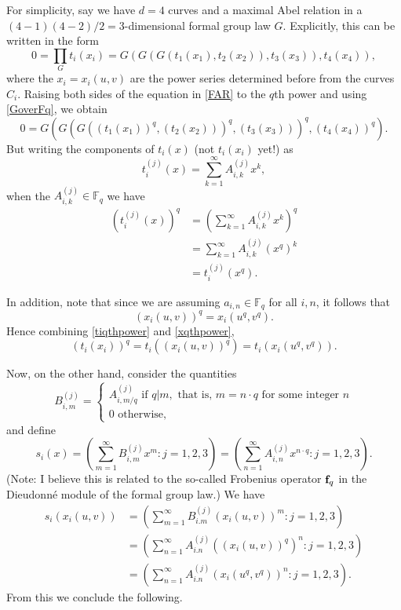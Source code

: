 \documentclass[12pt]{amsart}
\theoremstyle{theorem}
\newcommand{\FF}{\mathbb{F}}
\begin{document}
For simplicity, say we have $d = 4$ curves and a maximal Abel relation in a $(4 - 1)(4 - 2)/2 = 3$-dimensional formal group
law $G$.  Explicitly, this can be written in the form
\begin{equation}
\label{FAR}
0 = \prod_G t_i(x_i) = G(G(G(t_1(x_1),t_2(x_2)), t_3(x_3)), t_4(x_4)),
\end{equation}
where the $x_i = x_i(u,v)$ are the power series determined before from the curves $C_i$. 
Raising both sides of the equation in \eqref{FAR} to the $q$th power and using \eqref{GoverFq}, we obtain
\begin{equation}
\label{FARqthpower}
0 = G(G(G((t_1(x_1))^q,(t_2(x_2)))^q, (t_3(x_3)))^q, (t_4(x_4))^q).
\end{equation}
But writing the components of $t_i(x)$ (not $t_i(x_i)$ yet!) as 
$$t_i^{(j)}(x) = \sum_{k=1}^\infty A_{i,k}^{(j)} x^k,$$
when the $A_{i,k}^{(j)} \in \FF_q$ we have 
\begin{align}
\label{tiqthpower}
(t_i^{(j)}(x))^q &= \left(\sum_{k=1}^\infty A_{i,k}^{(j)} x^k\right)^q \nonumber \\
&=\sum_{k=1}^\infty A_{i,k}^{(j)} (x^q)^k \\
&= t_i^{(j)}(x^q).\nonumber
\end{align}

In addition, note that since we are assuming $a_{i,n} \in \FF_q$
for all $i,n$, it follows that 
\begin{equation}
\label{xqthpower}
(x_i(u,v))^q = x_i(u^q,v^q).
\end{equation}
Hence combining \eqref{tiqthpower} and \eqref{xqthpower}, 
$$(t_i(x_i))^q = t_i ((x_i(u,v))^q) = t_i(x_i(u^q,v^q)).$$

Now, on the other hand, consider the quantities 
$$B_{i,m}^{(j)} = \begin{cases} A_{i,m/q}^{(j)} \text{ if } q | m, \text{ that is, } m = n\cdot q \text{ for some integer } n \\
                                                       0 \text{ otherwise,}
                           \end{cases}
$$
and define 
\begin{equation}
\label{sdef}
s_i(x) = \left(\sum_{m=1}^\infty B_{i,m}^{(j)} x^m : j = 1,2,3\right) =  \left(\sum_{n=1}^\infty A_{i,n}^{(j)} x^{n\cdot q} : j = 1,2,3\right).
\end{equation}                      
 (Note:  I believe this is related to the so-called Frobenius operator ${\bf f}_q$ in the Dieudonn\'e module of the formal group law.)
 We have 
 \begin{align}
 \label{sixi}
 s_i(x_i(u,v)) &= \left(\sum_{m=1}^\infty B_{i.m}^{(j)} (x_i(u,v))^m : j = 1,2,3\right) \nonumber \\
 &= \left(\sum_{n=1}^\infty A_{i.n}^{(j)} ((x_i(u,v))^q)^n : j = 1,2,3\right)\nonumber \\
 &=  \left(\sum_{n=1}^\infty A_{i.n}^{(j)} (x_i(u^q,v^q))^n : j = 1,2,3\right).
 \end{align}
 From this we conclude the following.
 
\end{document}
